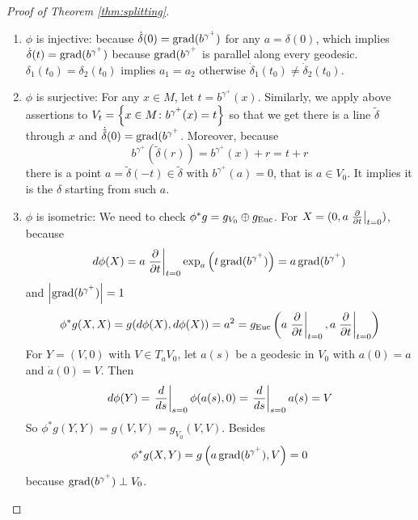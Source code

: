 \begin{enumerate}[label=\arabic{*}.]
\begin{proof}[Proof of Theorem \ref{thm:splitting}]
\begin{enumerate}[label=\Roman*.]
 			\item $\phi$ is injective: because $\dot{\delta}(0) = \operatorname{grad}(b^{\gamma^+})$ for any $a = \delta(0)$, which implies $\dot{\delta}(t) = \operatorname{grad}(b^{\gamma^+})$ because $\operatorname{grad}(b^{\gamma^+}$ is parallel along every geodesic. $\delta_1(t_0) = \delta_2(t_0)$ implies $a_1 = a_2$ otherwise $\dot{\delta}_1(t_0) \neq \dot{\delta}_2(t_0)$.

 			\item $\phi$ is surjective: For any $x \in M$, let $t = b^{\gamma^+}(x)$. Similarly, we apply above assertions to $V_t = \left\{x \in M \colon b^{\gamma^+}(x) = t\right\}$ so that we get there is a line $\tilde{\delta}$ through $x$ and $\dot{\tilde{\delta}}(0) = \operatorname{grad}(b^{\gamma^+}$.  Moreover, because 
 			\begin{equation*}
 				b^{\gamma^+}(\tilde{\delta}(r)) = b^{\gamma^+}(x) + r = t + r
 			\end{equation*}
 			there is a point $a=\tilde{\delta}(-t) \in \tilde{\delta}$ with $b^{\gamma^+}(a) = 0$, that is $a \in V_0$. It implies it is the $\delta$ starting from such $a$.

 			\item $\phi$ is isometric: We need to check $\phi^*g = g_{V_0}\oplus g_{\operatorname{Euc}}$. For $X = (0,a\left.\frac{\partial}{\partial t}\right\lvert_{t=0})$, because
 			\begin{equation*}
 				d\phi(X) = a\left.\frac{\partial}{\partial t}\right\lvert_{t=0}\exp_a\left(t\operatorname{grad}(b^{\gamma^+})\right) = a\operatorname{grad}(b^{\gamma^+})
 			\end{equation*}
 			and $\left\lvert\operatorname{grad}(b^{\gamma^+})\right\lvert = 1$
 			\begin{equation*}
 				\phi^*g(X,X) = g(d\phi(X),d\phi(X)) = a^2 = g_{\operatorname{Euc}}\left(a\left.\frac{\partial}{\partial t}\right\lvert_{t=0},a\left.\frac{\partial}{\partial t}\right\lvert_{t=0}\right)
 			\end{equation*}
 			For $Y = (V,0)$ with $V \in T_aV_0$, let $a(s)$ be a geodesic in $V_0$ with $a(0) = a$ and $\dot{a}(0) = V$. Then
 			\begin{equation*}
 				d\phi(Y) = \left.\frac{d}{ds}\right\lvert_{s=0}\phi(a(s),0) =\left.\frac{d}{ds}\right\lvert_{s=0}a(s) = V
 			\end{equation*}
 			So $\phi^*g(Y,Y) = g(V,V) = g_{V_0}(V,V)$. Besides
 			\begin{equation*}
 				\phi^*g(X,Y) = g\left(a\operatorname{grad}(b^{\gamma^+}),V\right) = 0
 			\end{equation*}
 			because $\operatorname{grad}(b^{\gamma^+}) \perp V_0$. \qedhere
		\end{enumerate}
	\end{proof}
\end{enumerate}















